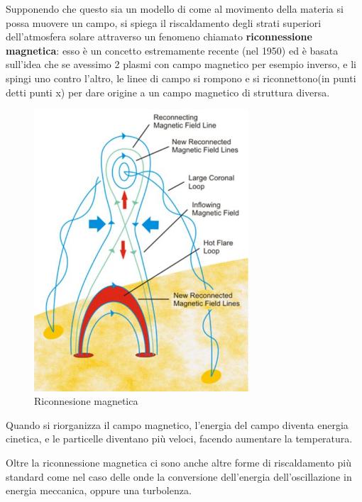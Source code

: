 \documentclass[a4paper,11pt]{article}
\begin{document}
Supponendo che questo sia un modello di come al movimento della materia si possa muovere un campo, si spiega il riscaldamento degli strati superiori dell'atmosfera solare attraverso un fenomeno chiamato \textbf{riconnessione magnetica}: esso è un concetto estremamente recente (nel 1950) ed è basata sull'idea che se avessimo 2 plasmi con campo magnetico per esempio inverso, e li spingi uno contro l'altro, le linee di campo si rompono e si riconnettono(in punti detti punti x) per dare origine a un campo magnetico di struttura diversa.
\begin{figure}[h!!]
        \centering
        \includegraphics[width=8cm]{Riconnesione magnetica.JPG}
        \caption{Riconnesione magnetica}
        \label{fig:Correnti parassite}
    \end{figure}
Quando si riorganizza il campo magnetico, l'energia del campo diventa energia cinetica, e le particelle diventano più veloci, facendo aumentare la temperatura. 

Oltre la riconnessione magnetica ci sono anche altre forme di riscaldamento più standard come nel caso delle onde la conversione dell'energia dell'oscillazione in energia meccanica, oppure una turbolenza. 
\end{document}
